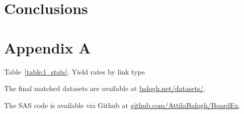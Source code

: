 \documentclass[12pt]{article}
\begin{document}
\section{Conclusions} \label{sec:Conclusions}

\clearpage
\section{Appendix A} \label{sec:Appendix}

\begin{center}
Table~\ref{table:l_stats}. Yield rates by link type\label{table:l_stats}

\end{center}

The final matched datasets are available at \href{https://balogh.net/datasets/}{balogh.net/datasets/}.

The SAS code is available via Github at \href{https://github.com/AttilaBalogh/BoardEx}{github.com/AttilaBalogh/BoardEx}.

\clearpage





\end{document}
